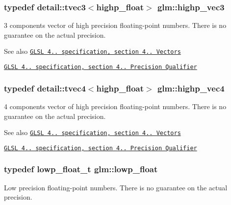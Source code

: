 \subsubsection[{highp\+\_\+vec3}]{\setlength{\rightskip}{0pt plus 5cm}typedef detail\+::tvec3$<$highp\+\_\+float$>$ {\bf glm\+::highp\+\_\+vec3}}\label{group__core__precision_gab660f8916a9c4a72bf71cd4279ae19fb}
3 components vector of high precision floating-\/point numbers. There is no guarantee on the actual precision.

\begin{DoxySeeAlso}{See also}
\href{http://www.opengl.org/registry/doc/GLSLangSpec.4.20.8.pdf}{\tt G\+L\+S\+L 4.. specification, section 4.. Vectors} 

\href{http://www.opengl.org/registry/doc/GLSLangSpec.4.20.8.pdf}{\tt G\+L\+S\+L 4.. specification, section 4.. Precision Qualifier} 
\end{DoxySeeAlso}
\hypertarget{group__core__precision_ga78dab0bca921cd9a1e1206ee3cf01207}{}
\subsubsection[{highp\+\_\+vec4}]{\setlength{\rightskip}{0pt plus 5cm}typedef detail\+::tvec4$<$highp\+\_\+float$>$ {\bf glm\+::highp\+\_\+vec4}}\label{group__core__precision_ga78dab0bca921cd9a1e1206ee3cf01207}
4 components vector of high precision floating-\/point numbers. There is no guarantee on the actual precision.

\begin{DoxySeeAlso}{See also}
\href{http://www.opengl.org/registry/doc/GLSLangSpec.4.20.8.pdf}{\tt G\+L\+S\+L 4.. specification, section 4.. Vectors} 

\href{http://www.opengl.org/registry/doc/GLSLangSpec.4.20.8.pdf}{\tt G\+L\+S\+L 4.. specification, section 4.. Precision Qualifier} 
\end{DoxySeeAlso}
\hypertarget{group__core__precision_ga2887fbc729ac5c1c5caeb7cd57a7145c}{}
\subsubsection[{lowp\+\_\+float}]{\setlength{\rightskip}{0pt plus 5cm}typedef lowp\+\_\+float\+\_\+t {\bf glm\+::lowp\+\_\+float}}\label{group__core__precision_ga2887fbc729ac5c1c5caeb7cd57a7145c}
Low precision floating-\/point numbers. There is no guarantee on the actual precision.

